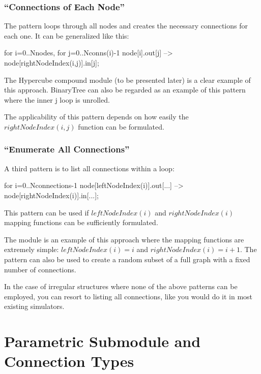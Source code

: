 \subsubsection{``Connections of Each Node''}

The pattern loops through all nodes and creates the necessary
connections for each one. It can be generalized like this:

\begin{ned}
for i=0..Nnodes, for j=0..Nconns(i)-1 {
    node[i].out[j] --> node[rightNodeIndex(i,j)].in[j];
}
\end{ned}

The Hypercube compound module (to be
presented later) is a clear example of this approach. BinaryTree can
also be regarded as an example of this pattern where the inner j loop
is unrolled.

The applicability of this pattern depends on how easily the $rightNodeIndex(i,j)$
function can be formulated.


\subsubsection{``Enumerate All Connections''}


A third pattern is to list all connections within a loop:

\begin{ned}
for i=0..Nconnections-1 {
    node[leftNodeIndex(i)].out[...] --> node[rightNodeIndex(i)].in[...];
}
\end{ned}

This pattern can be used if $leftNodeIndex(i)$ and $rightNodeIndex(i)$
mapping functions can be sufficiently formulated.

The  module is an example of this approach where the mapping
functions are extremely simple: $leftNodeIndex(i)=i$ and $rightNodeIndex(i) = i+1$.
The pattern can also be used to create a random subset of a full
graph with a fixed number of connections.

In the case of irregular structures where none of the above patterns
can be employed, you can resort to listing all connections, like you
would do it in most existing simulators.



\section{Parametric Submodule and Connection Types}

